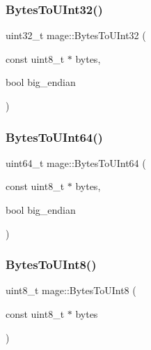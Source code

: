 \hypertarget{namespacemage_a46a019c7f927a6f559b36a8b5c01ab9c}{}\label{namespacemage_a46a019c7f927a6f559b36a8b5c01ab9c} 
\subsubsection{\texorpdfstring{Bytes\+To\+U\+Int32()}{BytesToUInt32()}}
{\footnotesize\ttfamily uint32\+\_\+t mage\+::\+Bytes\+To\+U\+Int32 (\begin{DoxyParamCaption}\item[{const uint8\+\_\+t $\ast$}]{bytes,  }\item[{bool}]{big\+\_\+endian }\end{DoxyParamCaption})}

\hypertarget{namespacemage_a93f1f8baabf199005ea96e0a2b6941e3}{}\label{namespacemage_a93f1f8baabf199005ea96e0a2b6941e3} 
\subsubsection{\texorpdfstring{Bytes\+To\+U\+Int64()}{BytesToUInt64()}}
{\footnotesize\ttfamily uint64\+\_\+t mage\+::\+Bytes\+To\+U\+Int64 (\begin{DoxyParamCaption}\item[{const uint8\+\_\+t $\ast$}]{bytes,  }\item[{bool}]{big\+\_\+endian }\end{DoxyParamCaption})}

\hypertarget{namespacemage_af1f2745091f9580c028990d0f2848ebe}{}\label{namespacemage_af1f2745091f9580c028990d0f2848ebe} 
\subsubsection{\texorpdfstring{Bytes\+To\+U\+Int8()}{BytesToUInt8()}}
{\footnotesize\ttfamily uint8\+\_\+t mage\+::\+Bytes\+To\+U\+Int8 (\begin{DoxyParamCaption}\item[{const uint8\+\_\+t $\ast$}]{bytes }\end{DoxyParamCaption})}

\hypertarget{namespacemage_aa6dc8bc35accb3ccaac7ee60a5361754}{}\label{namespacemage_aa6dc8bc35accb3ccaac7ee60a5361754} 
